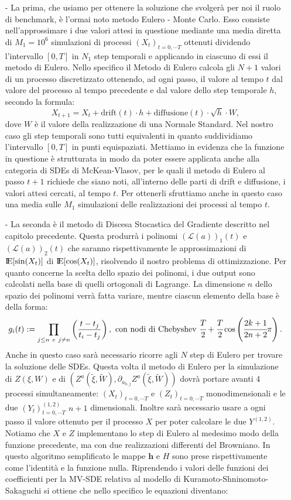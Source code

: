 \documentclass[a4paper,11pt,openright]{report}
\begin{document}
\begin{itemize}
\item[-] La prima, che usiamo per ottenere la soluzione che svolgerà per noi il ruolo di benchmark, è l'ormai noto metodo Eulero - Monte Carlo. Esso consiste nell'approssimare i due valori attesi in questione mediante una media diretta di $M_1 = 10^6$ simulazioni di processi $(X_t)_{t=0, \cdots T}$ ottenuti dividendo l'intervallo $[0,T]$ in $N_1$ step temporali e applicando in ciascuno di essi il metodo di Eulero. Nello specifico il Metodo di Eulero calcola gli $N+1$ valori di un processo discretizzato ottenendo, ad ogni passo, il valore al tempo $t$ dal valore del processo al tempo precedente e dal valore dello step temporale $h$, secondo la formula:
\[
X_{t+1} = X_t + \mathrm{drift}(t) \cdot h + \mathrm{diffusione}(t) \cdot \sqrt{h} \cdot W, 
\]
dove $W$ è il valore della realizzazione di una Normale Standard.
Nel nostro caso gli step temporali sono tutti equivalenti in quanto suddividiamo l'intervallo $[0,T]$ in punti equispaziati. Mettiamo in evidenza che la funzione in questione è strutturata in modo da poter essere applicata anche alla categoria di SDEs di McKean-Vlasov, per le quali il metodo di Eulero al passo $t+1$ richiede che siano noti, all'interno delle parti di drift e diffusione, i valori attesi cercati, al tempo $t$. Per ottenerli sfruttiamo anche in questo caso una media sulle $M_1$ simulazioni delle realizzazioni dei processi al tempo $t$. 
\item[-] La seconda è il metodo di Discesa Stocastica del Gradiente descritto nel capitolo precedente. Questa produrrà i polinomi $(\mathcal{L}(a))_1(t)$ e $(\mathcal{L}(a))_2(t)$ che saranno rispettivamente le  approssimazioni di ${\rm I\!E}[\sin(X_t)]$ di ${\rm I\!E}[\cos(X_t)]$, risolvendo il nostro problema di ottimizzazione. Per quanto concerne la scelta dello spazio dei polinomi, i due output sono calcolati nella base di quelli ortogonali di Lagrange. La dimensione $n$ dello spazio dei polinomi verrà fatta variare, mentre ciascun elemento della base è della forma: 
\[
g_i(t):=\prod_{j \leq n \ e  \ j\neq n} \left( \frac{t - t_j}{t_i - t_j} \right), \text{ con nodi di Chebyshev } \cfrac{T}{2} + \cfrac{T}{2} \cos \left( \cfrac{2k + 1}{2n +2} \pi \right).
\]
Anche in questo caso sarà necessario ricorre agli $N$ step di Eulero per trovare la soluzione delle SDEs. Questa volta il metodo di Eulero per la simulazione di $Z(\xi , W)$ e di $\left( Z^a(\tilde{\xi} , \tilde{W}), \partial_{a_{h,j}} Z^a(\tilde{\xi} , \tilde{W}) \right)$ dovrà portare avanti 4 processi simultaneamente: $(X_t)_{t=0, \cdots T}$ e $(Z_t)_{t=0, \cdots T}$ monodimensionali e le due $(Y_t)^{(1,2)}_{t=0, \cdots T}$ $n+1$ dimensionali. Inoltre sarà necessario usare a ogni passo il valore ottenuto per il processo $X$ per poter calcolare le due $Y^{(1,2)}$. Notiamo che $X$ e $Z$ implementano lo step di Eulero al medesimo modo della funzione precedente, ma con due realizzazioni differenti del Browniano. In questo algoritmo semplificato le mappe $\textbf{h}$ e $ H $ sono prese rispettivamente come l'identità e la funzione nulla. Riprendendo i valori delle funzioni dei coefficienti per la MV-SDE relativa al modello di Kuramoto-Shninomoto-Sakaguchi si ottiene che nello specifico le equazioni diventano:

\end{itemize}
\end{document}
